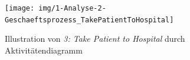 			\begin{figure}[H]
				\centering
				\texttt{[image: img/1-Analyse-2-Geschaeftsprozess\_TakePatientToHospital]}
				\caption{Illustration von \emph{3: Take Patient to Hospital} durch Aktivitätendiagramm}
				\label{fig:2-4-take-patient-to-hospital-aktivitaetendiagramm}
			\end{figure}
	\pagebreak

	
